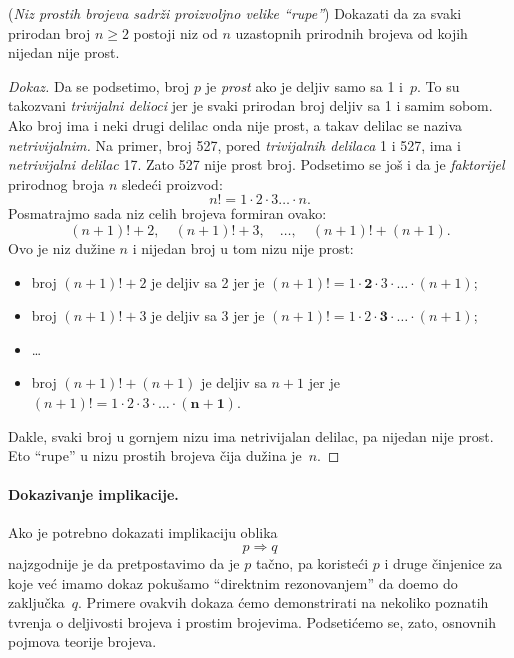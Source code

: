 \begin{EX} (\emph{Niz prostih brojeva sadr\v zi proizvoljno velike \enquote{rupe}})
 Dokazati da za svaki prirodan broj $n \ge 2$ postoji niz od $n$ uzastopnih
 prirodnih brojeva od kojih nijedan nije prost.
\end{EX}
\begin{proof}[Dokaz]
 Da se podsetimo, broj $p$ je \emph{prost} ako je deljiv samo sa 1 i~$p$. To su takozvani \emph{trivijalni delioci} jer je svaki prirodan
 broj deljiv sa 1 i samim sobom. Ako broj ima i neki drugi delilac onda nije prost, a takav delilac se naziva \emph{netrivijalnim.}
 Na primer, broj 527, pored \emph{trivijalnih delilaca} 1 i 527, ima i \emph{netrivijalni delilac} 17. Zato 527 nije prost broj.
 Podsetimo se jo\v s i da je \emph{faktorijel} prirodnog broja $n$ slede\'ci proizvod:
 $$
   n! = 1 \cdot 2 \cdot 3 \ldots \cdot n.
 $$
 Posmatrajmo sada niz celih brojeva formiran ovako:
 $$
   (n + 1)! + 2, \quad (n + 1)! + 3, \quad \ldots, \quad (n+1)! + (n+1).
 $$
 Ovo je niz du\v zine $n$ i nijedan broj u tom nizu nije prost:
 \begin{itemize}
  \item broj $(n + 1)! + 2$ je deljiv sa 2 jer je $(n + 1)! = 1 \cdot \mathbf{2} \cdot 3 \cdot \ldots \cdot (n + 1)$;
  \item broj $(n + 1)! + 3$ je deljiv sa 3 jer je $(n + 1)! = 1 \cdot 2 \cdot \mathbf{3} \cdot \ldots \cdot (n + 1)$;
  \item \ldots
  \item broj $(n + 1)! + (n + 1)$ je deljiv sa $n + 1$ jer je $(n + 1)! = 1 \cdot 2 \cdot 3 \cdot \ldots \cdot \mathbf{(n + 1)}$.
 \end{itemize}
 Dakle, svaki broj u gornjem nizu ima netrivijalan delilac, pa nijedan nije prost. Eto \enquote{rupe} u nizu prostih brojeva \v cija du\v zina je~$n$.
\end{proof}

\paragraph{Dokazivanje implikacije.}
Ako je potrebno dokazati implikaciju oblika
$$
  p \Rightarrow q
$$
najzgodnije je da pretpostavimo da je $p$ ta\v cno, pa koriste\'ci $p$ i druge \v cinjenice za koje ve\'c imamo dokaz
poku\v samo \enquote{direktnim rezonovanjem} da do\dj emo do zaklju\v cka~$q$. Primere ovakvih dokaza
\'cemo demonstrirati na nekoliko poznatih tvr\dj enja o deljivosti brojeva i prostim brojevima.
Podseti\'cemo se, zato, osnovnih pojmova teorije brojeva.

